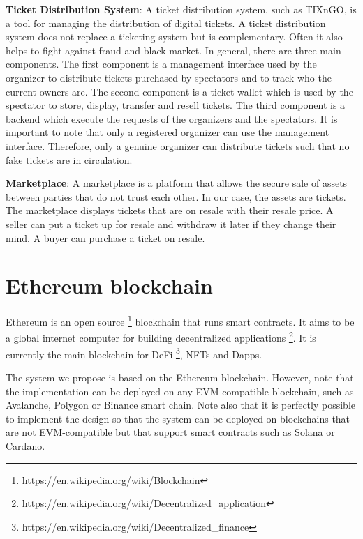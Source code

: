 \documentclass[a4paper,11pt,oneside]{report}
\begin{document}
\begin{description}
    \item \textbf{Ticket Distribution System}: A ticket distribution system, such as TIXnGO, is a tool for managing the distribution of digital tickets. A ticket distribution system does not replace a ticketing system but is complementary. Often it also helps to fight against fraud and black market. In general, there are three main components. The first component is a management interface used by the organizer to distribute tickets purchased by spectators and to track who the current owners are. The second component is a ticket wallet which is used by the spectator to store, display, transfer and resell tickets. The third component is a backend which execute the requests of the organizers and the spectators. It is important to note that only a registered organizer can use the management interface. Therefore, only a genuine organizer can distribute tickets such that no fake tickets are in circulation.
    \item \textbf{Marketplace}: A marketplace is a platform that allows the secure sale of assets between parties that do not trust each other. In our case, the assets are tickets. The marketplace displays tickets that are on resale with their resale price. A seller can put a ticket up for resale and withdraw it later if they change their mind. A buyer can purchase a ticket on resale.
\end{description}

\section{Ethereum blockchain}
Ethereum is an open source \footnote{https://en.wikipedia.org/wiki/Blockchain} blockchain that runs smart contracts. It aims to be a global internet computer for building decentralized applications \footnote{https://en.wikipedia.org/wiki/Decentralized_application}. It is currently the main blockchain for DeFi \footnote{https://en.wikipedia.org/wiki/Decentralized_finance}, NFTs and Dapps.

The system we propose is based on the Ethereum blockchain. However, note that the implementation can be deployed on any EVM-compatible blockchain, such as Avalanche, Polygon or Binance smart chain. Note also that it is perfectly possible to implement the design so that the system can be deployed on blockchains that are not EVM-compatible but that support smart contracts such as Solana or Cardano.
\end{document}
